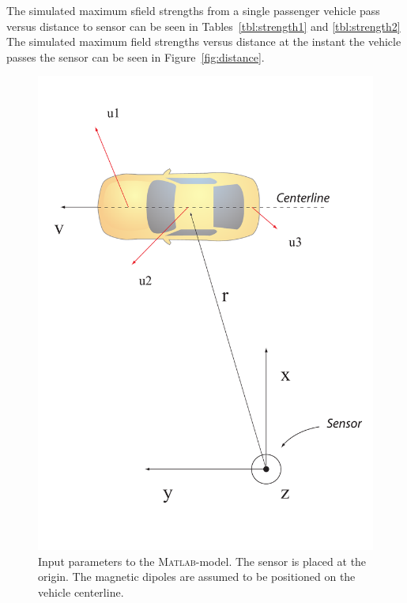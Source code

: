 The simulated maximum sfield strengths from a single passenger vehicle pass versus distance to sensor can be seen in Tables~\ref{tbl:strength1} and \ref{tbl:strength2} The simulated maximum field strengths versus distance at the instant the vehicle passes the sensor can be seen in Figure~\ref{fig:distance}.

\begin{figure}[!htbp]
 \centering
 \begin{minipage}{0.4\linewidth}
  \includegraphics[width=1\linewidth]{images/sensoraxis}
 \caption[Input parameters to the \textsc{Matlab}-model.]{Input parameters to the \textsc{Matlab}-model. The sensor is placed at the origin. The magnetic dipoles are assumed to be positioned on the vehicle centerline.}
 \label{fig:sensoraxis}
 \end{minipage}
\end{figure}

